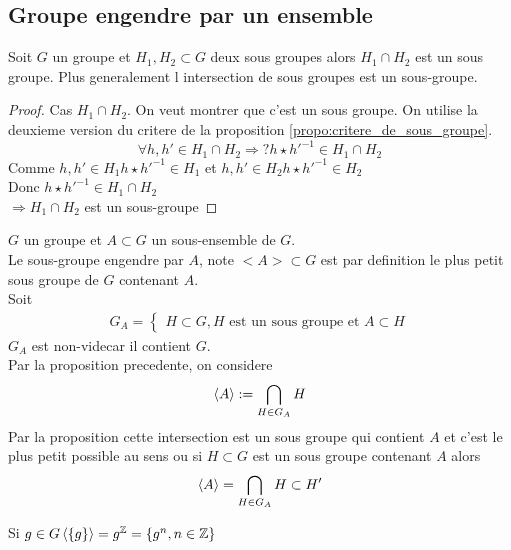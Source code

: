 \documentclass[../main.tex]{subfiles}
\begin{document}
\subsection{Groupe engendre par un ensemble}
\begin{propo}\label{propo:intersection_de_sous_groupes}
	Soit $G$ un groupe et $H_1, H_2 \subset G$ deux sous groupes alors $ H_1\cap H_2$ est un sous groupe.
	Plus generalement l intersection de sous groupes est un sous-groupe.
\end{propo}
\begin{proof}
Cas $ H_1 \cap H_2$.
On veut montrer que c'est un sous groupe. On utilise la deuxieme version du critere de la proposition \ref{propo:critere_de_sous_groupe}.
\[ 
\forall h,h' \in H_1\cap H_2 \Rightarrow ? h\star h'^{-1} \in H_1\cap H_2
\]
Comme $h,h' \in H_1 h\star h'^{-1}\in H_1$ et
$h,h' \in  H_2 h \star h'^{-1} \in H_2$\\
Donc $h\star h'^{-1}\in H_1 \cap H_2$\\
$  \Rightarrow H_1 \cap H_2$ est un sous-groupe
\end{proof}

\begin{defn}\label{defn:sous_groupe_engendre}
	$G$ un groupe et $A\subset G$ un sous-ensemble de $G$.\\
	Le sous-groupe engendre par $A$, note $<A> \subset G$ est par definition le plus petit sous groupe de $G$ contenant $A$.\\
	Soit
	\begin{align*}
	G_A =
	\begin{cases}
	H \subset G, H \text{ est un sous groupe et  } A \subset H
	\end{cases}
	\end{align*}
	$G_A$ est non-videcar il contient $G$.\\
	Par la proposition precedente, on considere
	\[ 
		\left\langle A\right\rangle := \bigcap_{H\in G_A} H
	\]
	Par la proposition cette intersection est un sous groupe qui contient $A$ et c'est le plus petit possible au sens ou si $H \subset G$ est un sous groupe contenant $A$ alors
	\[ 
		\left\langle A\right\rangle =\bigcap_{H \in G_A}H \subset H'
	\]
\end{defn}
\begin{exemple}
Si $g\in G \left\langle\{g\}\right\rangle = g ^{\mathbb{Z}} = \{g^{n}, n\in \mathbb{Z}\}$
\end{exemple}
\end{document}
